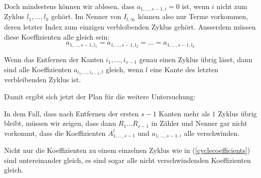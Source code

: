 Doch mindestens können wir ablesen, dass $a_{1,\dots,s-1,i}=0$ ist,
wenn $i$ nicht zum Zyklus $l_1,\dots,l_k$ gehört. Im Nenner von
$I_{l,\infty}$ können also nur Terme vorkommen, deren letzter Index
zum einzigen verbleibenden Zyklus gehört.
Ausserdem müssen diese Koeffizienten alle gleich sein:
\begin{equation}
a_{1,\dots,s-1,l_1}=a_{1,\dots,s-1,l_2}=\dots= a_{1,\dots,s-1,l_k}
\label{cyclecoefficients}
\end{equation}
\begin{hilfssatz}
\label{gleichekoef-n-1}
Wenn das Entfernen der Kanten $i_1,\dots,i_{s-1}$ genau einen
Zyklus übrig lässt, dann sind alle Koeffizienten
$a_{i_1,\dots,i_{s-1},l}$ gleich, wenn $l$ eine Kante des letzten
verbleibenden Zyklus ist.
\end{hilfssatz}
Damit ergibt sich jetzt der Plan für die weitere Untersuchung:
\begin{compactenum}
\item In dem Fall, dass nach Entfernen der ersten $s-1$ Kanten mehr als $1$
Zyklus übrig bleibt, müssen wir zeigen, dass dann $R_1\dots R_{s-1}$
in Zähler und Nenner gar nicht vorkommt, dass die Koeffizienten
$A_{1,\dots,s-1}^l$ und $a_{1,\dots,s-1,i}$ alle verschwinden.
\item Nicht nur die Koeffizienten zu einem einzelnen Zyklus
wie in (\ref{cyclecoefficients}) sind untereinander gleich, es sind
sogar alle nicht verschwindenden Koeffizienten gleich.
\end{compactenum}


